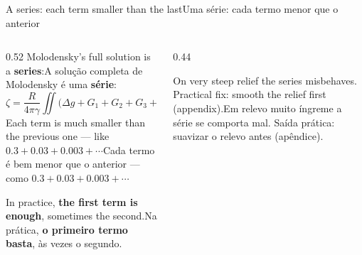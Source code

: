 \documentclass[aspectratio=169,11pt]{beamer}
\newcommand{\tr}[2]{\ifEN#2\else#1\fi}
\newcommand{\bnum}[1]{\textbf{\textcolor{mTeal}{#1}}}
\begin{document}
\begin{frame}{\tr{Uma série: cada termo menor que o anterior}{A series: each term smaller than
  the last}}
  \begin{columns}[T]
    \begin{column}{0.52\textwidth}
      \tr{A solução completa de Molodensky é uma \bnum{série}:}{Molodensky's full solution is a
      \bnum{series}:}
      \[ \zeta = \frac{R}{4\pi\gamma} \iint \bigl(\Delta g + G_1 + G_2 + G_3 + \cdots\bigr)
         S(\psi)\,\mathrm{d}\sigma \]
      \tr{Cada termo é bem menor que o anterior --- como $\num{0.3} + \num{0.03} + \num{0.003}
      + \cdots$}{Each term is much smaller than the previous one --- like $\num{0.3} +
      \num{0.03} + \num{0.003} + \cdots$}
      \medskip

      \tr{Na prática, \bnum{o primeiro termo basta}, às vezes o segundo.}{In practice,
      \bnum{the first term is enough}, sometimes the second.}
    \end{column}
    \begin{column}{0.44\textwidth}
      \centering
      \medskip
      \begin{cuidado}
        \small\tr{Em relevo muito íngreme a série se comporta mal. Saída prática: suavizar o
        relevo antes (apêndice).}{On very steep relief the series misbehaves. Practical fix:
        smooth the relief first (appendix).}
      \end{cuidado}
    \end{column}
  \end{columns}
\end{frame}
\end{document}
